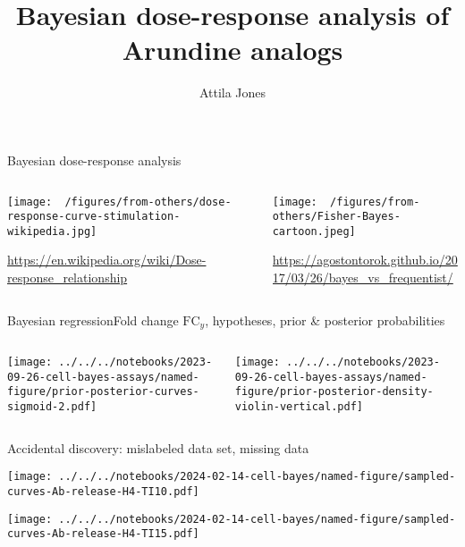 \documentclass[aspectratio=169]{beamer}
\title{Bayesian dose-response analysis of Arundine analogs}
\subtitle{}
\author{Attila Jones}
\date{}
\begin{document}
\titlepage

\begin{frame}{Bayesian dose-response analysis}
\begin{columns}[t]
\begin{column}{0.5\textwidth}

\texttt{[image: ~/figures/from-others/dose-response-curve-stimulation-wikipedia.jpg]}

\tiny{\url{https://en.wikipedia.org/wiki/Dose-response\_relationship}}
\end{column}

\begin{column}{0.5\textwidth}

\texttt{[image: ~/figures/from-others/Fisher-Bayes-cartoon.jpeg]}

\tiny{\url{https://agostontorok.github.io/2017/03/26/bayes_vs_frequentist/}}
\end{column}
\end{columns}
\end{frame}

\begin{frame}{Bayesian regression}{Fold change $\mathrm{FC}_y$, hypotheses,
  prior \& posterior probabilities}
\begin{columns}[t]
\begin{column}{0.5\textwidth}

\texttt{[image: ../../../notebooks/2023-09-26-cell-bayes-assays/named-figure/prior-posterior-curves-sigmoid-2.pdf]}
\end{column}
\begin{column}{0.5\textwidth}

\texttt{[image: ../../../notebooks/2023-09-26-cell-bayes-assays/named-figure/prior-posterior-density-violin-vertical.pdf]}
\end{column}
\end{columns}
\end{frame}

\begin{frame}{Accidental discovery: mislabeled data set, missing data}
\begin{center}
\texttt{[image: ../../../notebooks/2024-02-14-cell-bayes/named-figure/sampled-curves-Ab-release-H4-TI10.pdf]}
\end{center}

\begin{center}
\texttt{[image: ../../../notebooks/2024-02-14-cell-bayes/named-figure/sampled-curves-Ab-release-H4-TI15.pdf]}
\end{center}
\end{frame}
\end{document}
